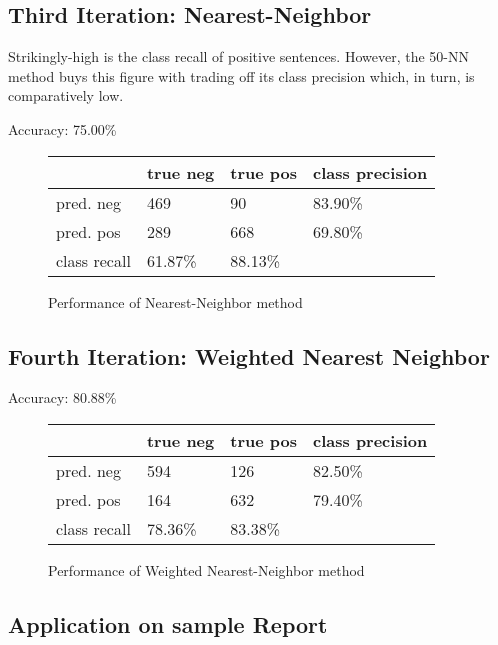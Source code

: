 \documentclass[11pt,titlepage,oneside,openany]{book}
\begin{document}
\subsection{Third Iteration: Nearest-Neighbor}
\label{sec:knn}



Strikingly-high is the class recall of positive sentences. However, the 50-NN method buys this figure with trading off its class precision which, in turn, is comparatively low.

Accuracy: 75.00\%

\begin{figure} [h!]
\centering
\begin{tabular}{ | l | l | l | l | }
\hline
	 & true neg & true pos & class precision \\ \hline
	pred. neg & 469 & 90 & 83.90\% \\ \hline
	pred. pos & 289 & 668 & 69.80\% \\ \hline
	class recall & 61.87\% & 88.13\% &  \\ \hline
\end{tabular}
\caption{Performance of Nearest-Neighbor method}
\label{fig.knn}
\end{figure}

\subsection{Fourth Iteration: Weighted Nearest Neighbor}
\label{sec:wknn}
Accuracy: 80.88\%

\begin{figure} [h!]
\centering
\begin{tabular}{ | l | l | l | l | }
\hline
	 & true neg & true pos & class precision \\ \hline
	pred. neg & 594 & 126 & 82.50\% \\ \hline
	pred. pos & 164 & 632 & 79.40\% \\ \hline
	class recall & 78.36\% & 83.38\% &  \\ \hline
\end{tabular}
\caption{Performance of Weighted Nearest-Neighbor method}
\label{fig.wknn}
\end{figure}

\subsection{Application on sample Report}
\end{document}
